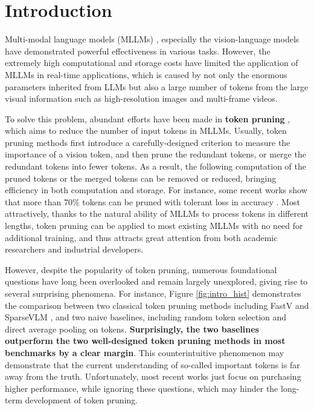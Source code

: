 \section{Introduction}
Multi-modal language models (MLLMs) \citep{huang2023languageneedaligningperception, driess2023palmeembodiedmultimodallanguage, liu2024visual, Qwen-VL}, especially the vision-language models have demonstrated powerful effectiveness in various tasks. However, the extremely high computational and storage costs have limited the application of MLLMs in real-time applications, which is caused by not only the enormous parameters inherited from LLMs but also a large number of tokens from the large visual information such as high-resolution images and multi-frame videos. 


To solve this problem, abundant efforts have been made in \textbf{token pruning} \citep{chen2024image, zhang2024sparsevlm, liu2024multi}, which aims to reduce the number of input tokens in MLLMs. Usually, token pruning methods first introduce a carefully-designed criterion to measure the importance of a vision token, and then prune the redundant tokens, or merge the redundant tokens into fewer tokens. As a result, the following computation of the pruned tokens or the merged tokens can be removed or reduced, bringing efficiency in both computation and storage. For instance, some recent works show that more than 70\% tokens can be pruned with tolerant loss in accuracy \citep{chen2024image}. Most attractively, thanks to the natural ability of MLLMs to process tokens in different lengths, token pruning can be applied to most existing MLLMs with no need for additional training, and thus attracts great attention from both academic researchers and industrial developers. 



However, despite the popularity of token pruning, numerous foundational questions have long been overlooked and remain largely unexplored, giving rise to several surprising phenomena. For instance, Figure \ref{fig:intro_hist} demonstrates the comparison between two classical token pruning methods including FastV \citep{chen2024image} and SparseVLM \citep{zhang2024sparsevlm}, and two naive baselines, including random token selection and direct average pooling on tokens. \textbf{Surprisingly, the two baselines outperform the two well-designed token pruning methods in most benchmarks by a clear margin}. This counterintuitive phenomenon may demonstrate that the current understanding of so-called important tokens is far away from the truth. Unfortunately, most recent works just focus on purchasing higher performance, while ignoring these questions, which may hinder the long-term development of token pruning.


